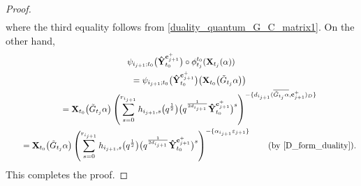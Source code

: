 \documentclass[11pt]{article}
\numberwithin{equation}{section}
\numberwithin{equation}{section}
\begin{document}
\begin{proof}
\begin{gather*}
 \end{gather*}
 where the third equality follows from \eqref{duality_quantum_G_C_matrix1}.
 On the other hand,
 \begin{gather*}
 \psi_{i_{j+1};t_{0}}\bigl(\mathbf{\hat{Y}}_{t_{0}}^{\mathbf{c}_{j+1}^{+}}\bigr)\circ\phi_{t_{j}}^{t_{0}}(\mathbf{X}_{t_{j}}(\alpha))\\
\qquad =\psi_{i_{j+1};t_{0}}\bigl(\mathbf{\hat{Y}}_{t_{0}}^{\mathbf{c}_{j+1}^{+}}\bigr)\bigl(\mathbf{X}_{t_{0}}\bigl(\tilde{G}_{t_{j}}\alpha\bigr)\bigr)\\
\qquad =\mathbf{X}_{t_{0}}\bigl(\tilde{G}_{t_{j}}\alpha\bigr)\left(\sum\limits_{s=0}^{r_{i_{j+1}}} h_{i_{j+1},s}\bigl(q^{\frac{1}{2}}\bigr)\bigl(q^{\frac{1}{2d_{i_{j+1}}}}\mathbf{\hat{Y}}_{t_{0}}^{\mathbf{c}_{j+1}^{+}}\bigr)^{s}\right)^{-\{d_{i_{j+1}}(\overline{\tilde{G}_{t_{j}}\alpha},\mathbf{c}_{j+1}^{+})_D\}}\\
\qquad =\mathbf{X}_{t_{0}}\bigl(\tilde{G}_{t_{j}}\alpha\bigr)\left(\sum\limits_{s=0}^{r_{i_{j+1}}} h_{i_{j+1},s}\bigl(q^{\frac{1}{2}}\bigr)\bigl(q^{\frac{1}{2d_{i_{j+1}}}}\mathbf{\hat{Y}}_{t_{0}}^{\mathbf{c}_{j+1}^{+}}\bigr)^{s}\right)^{-\{\alpha_{i_{j+1}}\varepsilon_{j+1}\}}\qquad\text{(by \eqref{D_form_duality})}.
 \end{gather*}
 This completes the proof.
\end{proof}
\end{document}
